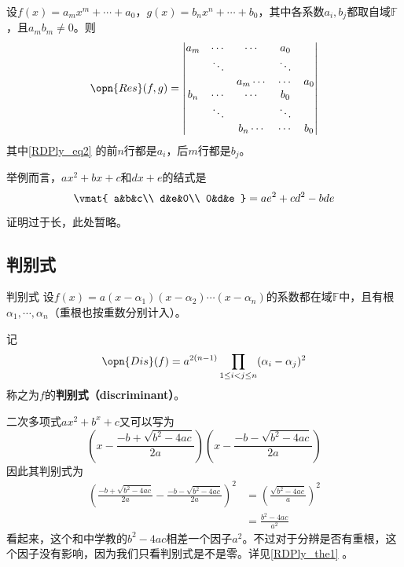 \begin{theorem}{}\label{RDPly_the2}
设$f(x)=a_mx^m+\cdots+a_0$，$g(x)=b_nx^n+\cdots+b_0$，其中各系数$a_i, b_j$都取自域$\mathbb{F}$，且$a_mb_m\neq 0$。则
\begin{equation}\label{RDPly_eq2}
\opn{Res}(f, g)=
\begin{vmatrix}
a_m&\cdots&\cdots&a_0\\
&\ddots& & \ddots\\
&&a_m\cdots&\cdots&a_0\\
b_n&\cdots&\cdots&b_0\\
&\ddots& & \ddots\\
&&b_n\cdots&\cdots&b_0\\
\end{vmatrix}
\end{equation}
其中\autoref{RDPly_eq2} 的前$n$行都是$a_i$，后$m$行都是$b_j$。

举例而言，$ax^2+bx+c$和$dx+e$的结式是
\begin{equation}
\vmat{
    a&b&c\\
    d&e&0\\
    0&d&e
}
=
ae^2+cd^2-bde
\end{equation}

\end{theorem}

证明过于长，此处暂略。



\subsection{判别式}

\begin{definition}{判别式}\label{RDPly_def1}
设$f(x)=a(x-\alpha_1)(x-\alpha_2)\cdots(x-\alpha_n)$的系数都在域$\mathbb{F}$中，且有根$\alpha_1, \cdots, \alpha_n$（重根也按重数分别计入）。

记
\begin{equation}\label{RDPly_eq3}
\opn{Dis}(f) = a^{2(n-1)}\prod_{1\leq i<j\leq n}(\alpha_i-\alpha_j)^2
\end{equation}
称之为$f$的\textbf{判别式（discriminant）}。
\end{definition}

\begin{example}{}
二次多项式$ax^2+b^x+c$又可以写为
\begin{equation}
(x-\frac{-b+\sqrt{b^2-4ac}}{2a})(x-\frac{-b-\sqrt{b^2-4ac}}{2a})
\end{equation}
因此其判别式为
\begin{equation}
\begin{aligned}
(\frac{-b+\sqrt{b^2-4ac}}{2a}-\frac{-b-\sqrt{b^2-4ac}}{2a})^2 &= (\frac{\sqrt{b^2-4ac}}{a})^2\\
&=\frac{b^2-4ac}{a^2}
\end{aligned}
\end{equation}
看起来，这个和中学教的$b^2-4ac$相差一个因子$a^2$。不过对于分辨是否有重根，这个因子没有影响，因为我们只看判别式是不是零。详见\autoref{RDPly_the1} 。
\end{example}


